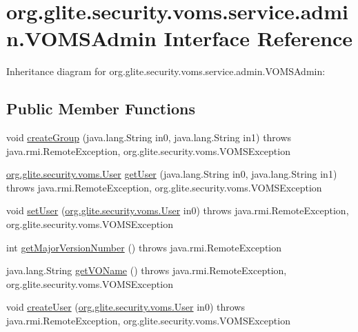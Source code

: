 \hypertarget{interfaceorg_1_1glite_1_1security_1_1voms_1_1service_1_1admin_1_1VOMSAdmin}{
\section{org.glite.security.voms.service.admin.VOMSAdmin Interface Reference}
\label{interfaceorg_1_1glite_1_1security_1_1voms_1_1service_1_1admin_1_1VOMSAdmin}
}


Inheritance diagram for org.glite.security.voms.service.admin.VOMSAdmin:
\subsection*{Public Member Functions}
\begin{DoxyCompactItemize}
\item 
void \hyperlink{interfaceorg_1_1glite_1_1security_1_1voms_1_1service_1_1admin_1_1VOMSAdmin_a63cdf7b5f384d24b9680763e08562a5f}{createGroup} (java.lang.String in0, java.lang.String in1)  throws java.rmi.RemoteException, org.glite.security.voms.VOMSException
\item 
\hyperlink{classorg_1_1glite_1_1security_1_1voms_1_1User}{org.glite.security.voms.User} \hyperlink{interfaceorg_1_1glite_1_1security_1_1voms_1_1service_1_1admin_1_1VOMSAdmin_a539d9d88122edfeae1cb2d658528ea1d}{getUser} (java.lang.String in0, java.lang.String in1)  throws java.rmi.RemoteException, org.glite.security.voms.VOMSException
\item 
void \hyperlink{interfaceorg_1_1glite_1_1security_1_1voms_1_1service_1_1admin_1_1VOMSAdmin_a452eb7b4ee3bcf8c3f7f155b1e772321}{setUser} (\hyperlink{classorg_1_1glite_1_1security_1_1voms_1_1User}{org.glite.security.voms.User} in0)  throws java.rmi.RemoteException, org.glite.security.voms.VOMSException
\item 
int \hyperlink{interfaceorg_1_1glite_1_1security_1_1voms_1_1service_1_1admin_1_1VOMSAdmin_a2de952b7dee8eac5a15e693341facc3a}{getMajorVersionNumber} ()  throws java.rmi.RemoteException
\item 
java.lang.String \hyperlink{interfaceorg_1_1glite_1_1security_1_1voms_1_1service_1_1admin_1_1VOMSAdmin_ad09b4594f6d5e5ae1fe114b5bdb5e442}{getVOName} ()  throws java.rmi.RemoteException, org.glite.security.voms.VOMSException
\item 
void \hyperlink{interfaceorg_1_1glite_1_1security_1_1voms_1_1service_1_1admin_1_1VOMSAdmin_a2410cf8cf557ad58a5d59e731e964565}{createUser} (\hyperlink{classorg_1_1glite_1_1security_1_1voms_1_1User}{org.glite.security.voms.User} in0)  throws java.rmi.RemoteException, org.glite.security.voms.VOMSException

\end{DoxyCompactItemize}
